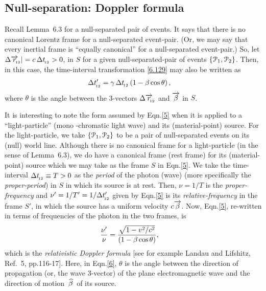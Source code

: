 \subsection{Null-separation: Doppler formula}
Recall Lemma~6.3 for a null-separated pair of events. 
It 
says that there is no canonical Lorentz frame for a  
null-separated event-pair. (Or, we may say that every 
inertial frame is ``equally canonical'' for a 
null-separated 
event-pair.) So, let $\Delta \overrightarrow{r}_{_{\hspace*{-1.5pt}{\negthinspace\negthinspace 12}}} | = 
c\, 
\Delta t_{_{\hspace*{-1.5pt}{12}}}>0$, in $S$ for a given 
null-separated-pair 
of events $\{\EuScript{P}_1,\EuScript{P}_2\}$.  Then, 
in 
this case, the time-interval transformation  
\eqref{6.129} 
may also be written as
\begin{align}\label{5}
\Delta t'_{_{\hspace*{-1.5pt}{12}}} & ={{\gamma}}\, \Delta t_{_{\hspace*{-1.5pt}{12}}}
\left(1-{{\beta}}\cos{\theta}\right),
\end{align}
where $\theta$ is the angle between the 3-vectors
$\Delta\overrightarrow{r}_{_{\hspace*{-1.5pt}{\negthinspace\negthinspace 12}}}$ and $\overrightarrow{{\beta}}$ in 
$S$.

It is interesting to note the form assumed by  
Eqn.\eqref{5} when it is applied to a 
``light-particle'' 
(mono  -chromatic light wave) and its (material-point) 
source.  For the light-particle, we take 
$\{\EuScript{P}_1,\EuScript{P}_2\}$ to be a pair of  
null-separated events on its (null) world line.  
Although 
there is no canonical frame for a light-particle (in 
the  
sense of Lemma~6.3), we do have a canonical frame 
(rest 
frame) for its (material-point) source which we may 
take as 
the frame $S$ in Eqn.\eqref{5}. We take the 
time-interval  $\Delta t_{_{\hspace*{-1.5pt}{12}}} \equiv T>0 $ as the 
\textsl{period} of the photon (wave) (more specifically 
the 
\textsl{proper-period}) in $S$ in which its source is 
at 
rest. Then, $\nu =1/T $ is the 
\textsl{proper-frequency} 
and 
$\nu' =1/T'=1/\Delta t'_{_{\hspace*{-1.5pt}{12}}}$ given by 
Eqn.\eqref{5} is 
its \textsl{relative-frequency} in the frame $S'$, in 
which 
the source has a  uniform velocity $c\overrightarrow{{\beta}}$. 
Now, 
Eqn.\eqref{5}, re-written in  terms of frequencies of 
the 
photon in the two frames, is
\begin{align}\label{6}
\frac{\nu'}{\nu}&
=\frac{\sqrt{1-v^2/c^2}} 
{\left(1-{{\beta}}\cos{\theta}\right)},
\end{align}
which is the \textsl{relativistic Doppler formula} [see 
for 
example Landau and Lifshitz, Ref.~5, pp.116-17]. Here, 
in  Eqn.\eqref{6}, $\theta$ is the angle between the 
direction of  propagation (or, the wave  3-vector) of 
the 
plane  electromagnetic wave and the direction of 
motion 
$\,{\widehat{{\beta}}}\,$ of its source.

